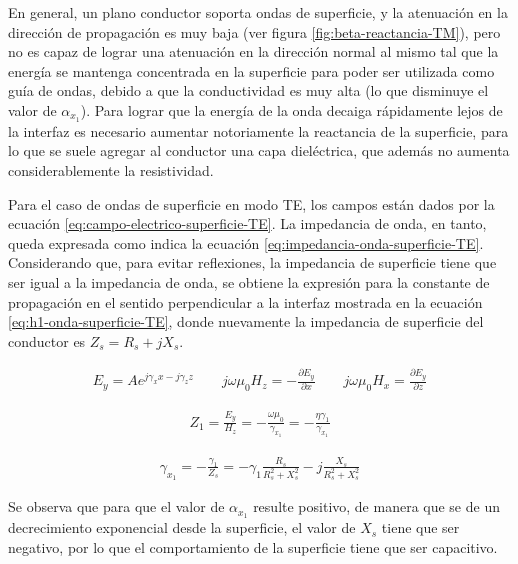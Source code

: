 En general, un plano conductor soporta ondas de superficie, y la atenuación en la dirección de propagación es muy baja (ver figura \ref{fig:beta-reactancia-TM}), pero no es capaz de lograr una atenuación en la dirección normal al mismo tal que la energía se mantenga concentrada en la superficie para poder ser utilizada como guía de ondas, debido a que la conductividad es muy alta (lo que disminuye el valor de $\alpha_x_1$). Para lograr que la energía de la onda decaiga rápidamente lejos de la interfaz es necesario aumentar notoriamente la reactancia de la superficie, para lo que se suele agregar al conductor una capa dieléctrica, que además no aumenta considerablemente la resistividad.

Para el caso de ondas de superficie en modo TE, los campos están dados por la ecuación \ref{eq:campo-electrico-superficie-TE}. La impedancia de onda, en tanto, queda expresada como indica la ecuación \ref{eq:impedancia-onda-superficie-TE}. Considerando que, para evitar reflexiones, la impedancia de superficie tiene que ser igual a la impedancia de onda, se obtiene la expresión para la constante de propagación en el sentido perpendicular a la interfaz mostrada en la ecuación \ref{eq:h1-onda-superficie-TE}, donde nuevamente la impedancia de superficie del conductor es $Z_s = R_s +jX_s$.

\begin{equation}
	\label{eq:campo-electrico-superficie-TE}
	\begin{aligned}
		E_y = A e^{j\gamma_x x-j\gamma_z z} \qquad j\omega \mu_0 H_z = -\frac{\partial E_y}{\partial x} \qquad j\omega \mu_0 H_x = \frac{\partial E_y}{\partial z}
	\end{aligned}
\end{equation}

\begin{align}
	\label{eq:impedancia-onda-superficie-TE}
	Z_1 = \frac{E_y}{H_z} = -\frac{\omega \mu_0}{\gamma_{x_1}} = -\frac{\eta \gamma_1}{\gamma_{x_1}}
\end{align}

\begin{align}
	\label{eq:h1-onda-superficie-TE}
	\gamma_{x_1} = -\frac{\gamma_1}{Z_s} = -\gamma_1 \frac{R_s}{{R_s^2 + X_s^2}}-j\frac{X_s}{R_s^2 + X_s^2}
\end{align}

Se observa que para que el valor de $\alpha_{x_1}$ resulte positivo, de manera que se de un decrecimiento exponencial desde la superficie, el valor de $X_s$ tiene que ser negativo, por lo que el comportamiento de la superficie tiene que ser capacitivo.


